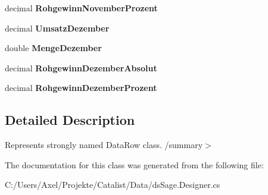 \begin{DoxyCompactItemize}
\item 
decimal {\bfseries Rohgewinn\+November\+Prozent}\hypertarget{class_products_1_1_data_1_1ds_sage_1_1_kundenumsatz_basis_row_a22f968026f8aa20d4cbccc983ed08814}{}\label{class_products_1_1_data_1_1ds_sage_1_1_kundenumsatz_basis_row_a22f968026f8aa20d4cbccc983ed08814}

\item 
decimal {\bfseries Umsatz\+Dezember}\hypertarget{class_products_1_1_data_1_1ds_sage_1_1_kundenumsatz_basis_row_ab7cd216c58ccc24fa1c40fc6b5c242b0}{}\label{class_products_1_1_data_1_1ds_sage_1_1_kundenumsatz_basis_row_ab7cd216c58ccc24fa1c40fc6b5c242b0}

\item 
double {\bfseries Menge\+Dezember}\hypertarget{class_products_1_1_data_1_1ds_sage_1_1_kundenumsatz_basis_row_ae5e925b134f9f37993b2117df9ccdae7}{}\label{class_products_1_1_data_1_1ds_sage_1_1_kundenumsatz_basis_row_ae5e925b134f9f37993b2117df9ccdae7}

\item 
decimal {\bfseries Rohgewinn\+Dezember\+Absolut}\hypertarget{class_products_1_1_data_1_1ds_sage_1_1_kundenumsatz_basis_row_aa09dde4a9f7d1a99a078bcff71d3dc09}{}\label{class_products_1_1_data_1_1ds_sage_1_1_kundenumsatz_basis_row_aa09dde4a9f7d1a99a078bcff71d3dc09}

\item 
decimal {\bfseries Rohgewinn\+Dezember\+Prozent}\hypertarget{class_products_1_1_data_1_1ds_sage_1_1_kundenumsatz_basis_row_a1526bef1d6d521b32554318645ac34aa}{}\label{class_products_1_1_data_1_1ds_sage_1_1_kundenumsatz_basis_row_a1526bef1d6d521b32554318645ac34aa}

\end{DoxyCompactItemize}


\subsection{Detailed Description}
Represents strongly named Data\+Row class. /summary$>$ 

The documentation for this class was generated from the following file\+:\begin{DoxyCompactItemize}
\item 
C\+:/\+Users/\+Axel/\+Projekte/\+Catalist/\+Data/ds\+Sage.\+Designer.\+cs\end{DoxyCompactItemize}
